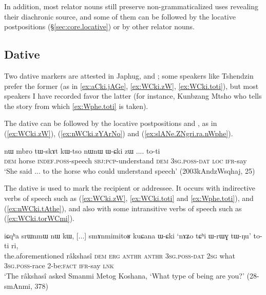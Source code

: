 In addition, most relator nouns still preserve non-grammaticalized uses revealing their diachronic source, and some of them can be followed by the locative postpositions (§\ref{sec:core.locative}) or by other relator nouns.

\subsection{Dative} \label{sec:dative} 
Two dative markers are attested in Japhug,  and ; some speakers like Tshendzin prefer the former (as in \ref{ex:aCki.jAGe}, \ref{ex:WCki.zW}, \ref{ex:WCki.toti}), but most speakers I have recorded favor the latter (for instance, Kunbzang Mtsho who tells the story from which \ref{ex:Wphe.toti} is taken).

The dative can be followed by the locative postpositions  and , as in (\ref{ex:WCki.zW}), (\ref{ex:nWCki.zYArNo}) and (\ref{ex:slANe.ZNgri.ra.nWphe}).


\begin{exe}
\ex \label{ex:WCki.zW}
\gll nɯ mbro tɯ-skɤt kɯ-tso nɯnɯ ɯ-ɕki zɯ .... to-ti \\
\textsc{dem} horse \textsc{indef}.\textsc{poss}-speech \textsc{sbj}:\textsc{pcp}-understand \textsc{dem} \textsc{3sg}.\textsc{poss}-\textsc{dat} \textsc{loc} { } \textsc{ifr}-say \\
\glt `She said ... to the horse who could understand speech' (2003kAndzWsqhaj, 25)
\end{exe}

The dative is used to mark the recipient or addressee. It occurs with indirective verbs of speech such as  (\ref{ex:WCki.zW}, \ref{ex:WCki.toti} and \ref{ex:Wphe.toti}),  and  (\ref{ex:nWCki.tAthe}), and also with some intransitive verbs of speech such as  (\ref{ex:WCki.torWCmi}).

\begin{exe}
\ex \label{ex:WCki.toti}
\gll iɕqʰa srɯnmɯ nɯ kɯ, [...] smɤnmimitoʁ kuɕana ɯ-ɕki `nɤʑo tɕʰi ɯ-rɯɣ tɯ-ŋu' to-ti ri, \\
the.aforementioned râkshasî \textsc{dem} \textsc{erg} { }  \textsc{anthr} \textsc{anthr} \textsc{3sg}.\textsc{poss}-\textsc{dat} \textsc{2sg} what \textsc{3sg}.\textsc{poss}-race 2-be:\textsc{fact} \textsc{ifr}-say \textsc{lnk} \\
\glt `The râkshasî asked Smanmi Metog Koshana, `What type of being are you?' (28-smAnmi, 378)
\end{exe}

